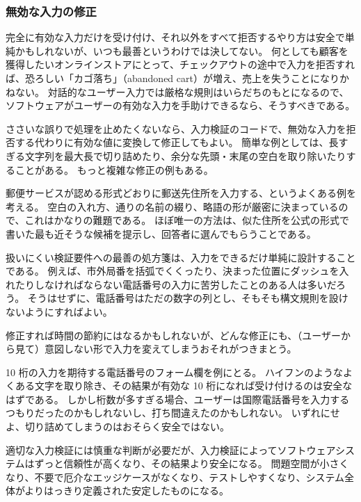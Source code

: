 \documentclass[uplatex]{jsarticle}
\def\label#1{}%
\begin{document}
\subsubsection{無効な入力の修正}

完全に有効な入力だけを受け付け、それ以外をすべて拒否するやり方は安全で単純かもしれないが、いつも最善というわけでは決してない。
何としても顧客を獲得したいオンラインストアにとって、チェックアウトの途中で入力を拒否すれば、恐ろしい「カゴ落ち」（abandoned cart）が増え、売上を失うことになりかねない。
対話的なユーザー入力では厳格な規則はいらだちのもとになるので、ソフトウェアがユーザーの有効な入力を手助けできるなら、そうすべきである。

ささいな誤りで処理を止めたくないなら、入力検証のコードで、無効な入力を拒否する代わりに有効な値に変換して修正してもよい。
簡単な例としては、長すぎる文字列を最大長で切り詰めたり、余分な先頭・末尾の空白を取り除いたりすることがある。
もっと複雑な修正の例もある。

\begin{exa}[郵送先住所の入力]\label{exa:ch10-mailing-address}
郵便サービスが認める形式どおりに郵送先住所を入力する、というよくある例を考える。
空白の入れ方、通りの名前の綴り、略語の形が厳密に決まっているので、これはかなりの難題である。
ほぼ唯一の方法は、似た住所を公式の形式で書いた最も近そうな候補を提示し、回答者に選んでもらうことである。
\end{exa}

扱いにくい検証要件への最善の処方箋は、入力をできるだけ単純に設計することである。
例えば、市外局番を括弧でくくったり、決まった位置にダッシュを入れたりしなければならない電話番号の入力に苦労したことのある人は多いだろう。
そうはせずに、電話番号はただの数字の列とし、そもそも構文規則を設けないようにすればよい。

修正すれば時間の節約にはなるかもしれないが、どんな修正にも、（ユーザーから見て）意図しない形で入力を変えてしまうおそれがつきまとう。

\begin{exa}[電話番号の修正の危険]\label{exa:ch10-phone-correction}
10 桁の入力を期待する電話番号のフォーム欄を例にとる。
ハイフンのようなよくある文字を取り除き、その結果が有効な 10 桁になれば受け付けるのは安全なはずである。
しかし桁数が多すぎる場合、ユーザーは国際電話番号を入力するつもりだったのかもしれないし、打ち間違えたのかもしれない。
いずれにせよ、切り詰めてしまうのはおそらく安全ではない。
\end{exa}

適切な入力検証には慎重な判断が必要だが、入力検証によってソフトウェアシステムはずっと信頼性が高くなり、その結果より安全になる。
問題空間が小さくなり、不要で厄介なエッジケースがなくなり、テストしやすくなり、システム全体がよりはっきり定義された安定したものになる。
\end{document}
